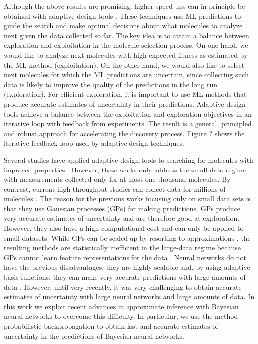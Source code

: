 Although the above results are promising, higher speed-ups can in principle be
obtained with adaptive design tools \cite{jones1998efficient}. These techniques
use ML predictions to guide the search and make optimal decisions about what
molecules to analyze next given the data collected so far. The key idea is to
attain a balance between exploration and exploitation in the molecule selection
process. On one hand, we would like to analyze next molecules with high
expected fitness as estimated by the ML method (exploitation). On the other
hand, we would also like to select next molecules for which the ML predictions
are uncertain, since collecting such data is likely to improve the quality of
the predictions in the long run (exploration). For efficient
exploration, it is important to use ML methods that produce accurate
estimates of uncertainty in their predictions. 
Adaptive design tools achieve a balance
between the exploitation and exploration objectives in an iterative loop with
feedback from experiments. 
The result is a general, principled and robust
approach for accelerating the discovery process. 
Figure ? shows the iterative
feedback loop used by adaptive design techniques.

Several studies have applied adaptive design tools to searching for
molecules with improved properties \cite{Xue_2016,Seko_2015,Negoescu_2011,De_Grave_2008}. 
However, these works only address the small-data regime, with measurements
collected only for at most one thousand molecules. By contrast, current high-throughput studies can collect data for
millions of molecules \cite{Hachmann_2011}. 
The reason for the previous works focusing only
on small data sets is that they 
use Gaussian processes (GPs) \cite{rasmussen2006gaussian} for making predictions. GPs
produce very accurate estimates of uncertainty and are therefore 
good at exploration. However, they also have a high computational cost and can only be applied to small datasets. While GPs can be scaled up by resorting to approximations  \cite{snelson2005sparse,hensman2015scalable}, the resulting methods are
statistically inefficient in the large-data regime because GPs cannot learn
feature representations for the data \cite{bengio2007scaling}.
Neural networks do not have the previous disadvantages: they are highly scalable and,
by using adaptive basis functions, they can make very accurate predictions with
large amounts of data \cite{lecun2015deep}. However, until very recently, it was very
challenging to obtain accurate estimates of uncertainty with large
neural networks and large amounts of data. In this work we exploit
recent advances in approximate inference with Bayesian neural networks to overcome this difficulty. 
In particular, we use the method probabilistic backpropagation \cite{Hernandez-Lobato15b} to obtain fast
and accurate estimates of uncertainty in the predictions of Bayesian neural networks.

